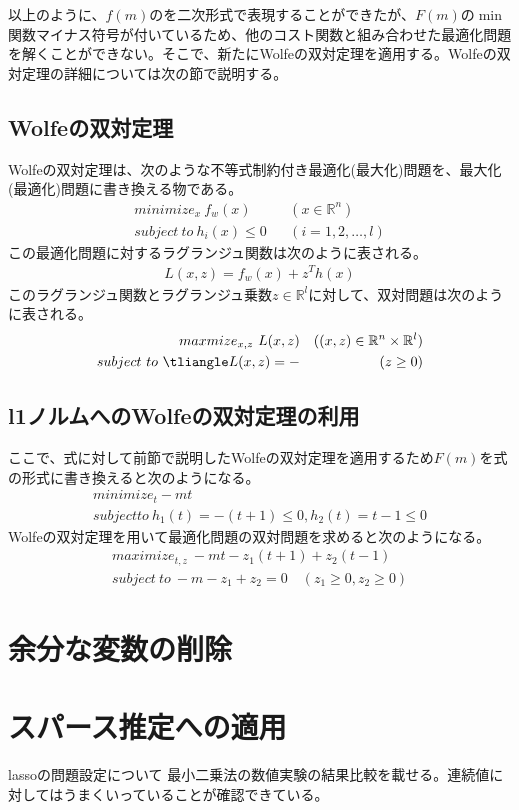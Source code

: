 \documentclass[paper]{ieicej}
\begin{document}
以上のように、$f(m)$のを二次形式で表現することができたが、$F(m)$の$\min$関数マイナス符号が付いているため、他のコスト関数と組み合わせた最適化問題を解くことができない。そこで、新たにWolfeの双対定理を適用する。Wolfeの双対定理の詳細については次の節で説明する。
\subsection{Wolfeの双対定理}
Wolfeの双対定理は、次のような不等式制約付き最適化(最大化)問題を、最大化(最適化)問題に書き換える物である。
\begin{eqnarray}
 minimize_{x} \ f_{w}(x) & & (x\in\mathbb{R}^{n}) \nonumber \\
 subject \ to \ h_{i}(x) \leq 0 & & (i=1,2,\dots,l)
\end{eqnarray}
この最適化問題に対するラグランジュ関数は次のように表される。
\begin{eqnarray}
 L(x,z) = f_{w}(x)+z^{T}h(x)
\end{eqnarray}
このラグランジュ関数とラグランジュ乗数$z\in\mathbb{R}^{l}$に対して、双対問題は次のように表される。
\begin{eqnarray}
 maxmize_{x,z} \ L(x,z) & & ((x,z)\in\mathbb{R}^{n}\times\mathbb{R}^{l}) \nonumber \\
 subject \ to \ \tliangle L(x,z) = - & & (z\geq 0)
\end{eqnarray}

\subsection{l1ノルムへのWolfeの双対定理の利用}
ここで、式に対して前節で説明したWolfeの双対定理を適用するため$F(m)$を式の形式に書き換えると次のようになる。
\begin{eqnarray}
 minimize_{t} -mt \nonumber \\
 subject to \ h_{1}(t) = -(t+1) \leq 0,h_{2}(t) = t-1 \leq 0
\end{eqnarray}
Wolfeの双対定理を用いて最適化問題の双対問題を求めると次のようになる。
\begin{eqnarray}
 maximize_{t,z} \ -mt-z_{1}(t+1)+z_{2}(t-1) \nonumber \\
 subject \ to \ -m-z_{1}+z_{2}=0 \quad (z_{1}\geq 0,z_{2}\geq 0)
\end{eqnarray}

\section{余分な変数の削除}
\section{スパース推定への適用}
lassoの問題設定について
最小二乗法の数値実験の結果比較を載せる。連続値に対してはうまくいっていることが確認できている。
\end{document}
